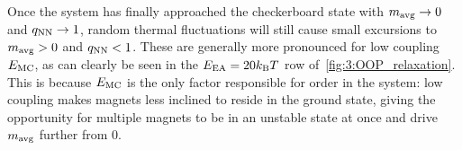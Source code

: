 Once the system has finally approached the checkerboard state with $m_\mathrm{avg} \rightarrow 0$ and $q_\mathrm{NN} \rightarrow 1$, random thermal fluctuations will still cause small excursions to $m_\mathrm{avg} > 0$ and $q_\mathrm{NN} < 1$.
These are generally more pronounced for low coupling $E_\mathrm{MC}$, as can clearly be seen in the $\EEA = 20\kBT$ row of~\cref{fig:3:OOP_relaxation}.
This is because $E_\mathrm{MC}$ is the only factor responsible for order in the system: low coupling makes magnets less inclined to reside in the ground state, giving the opportunity for multiple magnets to be in an unstable state at once and drive $m_\mathrm{avg}$ further from 0.


